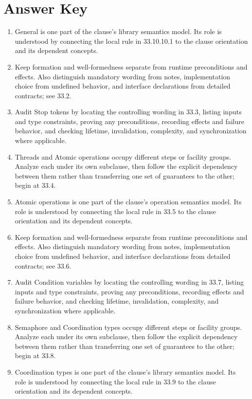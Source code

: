 \documentclass[11pt,letterpaper]{article}
\begin{document}
\clearpage\section{Answer Key}
\begin{enumerate}
\item General is one part of the clause's library semantics model. Its role is understood by connecting the local rule in 33.10.10.1 to the clause orientation and its dependent concepts.
\item Keep formation and well-formedness separate from runtime preconditions and effects. Also distinguish mandatory wording from notes, implementation choice from undefined behavior, and interface declarations from detailed contracts; see 33.2.
\item Audit Stop tokens by locating the controlling wording in 33.3, listing inputs and type constraints, proving any preconditions, recording effects and failure behavior, and checking lifetime, invalidation, complexity, and synchronization where applicable.
\item Threads and Atomic operations occupy different steps or facility groups. Analyze each under its own subclause, then follow the explicit dependency between them rather than transferring one set of guarantees to the other; begin at 33.4.
\item Atomic operations is one part of the clause's operation semantics model. Its role is understood by connecting the local rule in 33.5 to the clause orientation and its dependent concepts.
\item Keep formation and well-formedness separate from runtime preconditions and effects. Also distinguish mandatory wording from notes, implementation choice from undefined behavior, and interface declarations from detailed contracts; see 33.6.
\item Audit Condition variables by locating the controlling wording in 33.7, listing inputs and type constraints, proving any preconditions, recording effects and failure behavior, and checking lifetime, invalidation, complexity, and synchronization where applicable.
\item Semaphore and Coordination types occupy different steps or facility groups. Analyze each under its own subclause, then follow the explicit dependency between them rather than transferring one set of guarantees to the other; begin at 33.8.
\item Coordination types is one part of the clause's library semantics model. Its role is understood by connecting the local rule in 33.9 to the clause orientation and its dependent concepts.

\end{enumerate}
\end{document}
